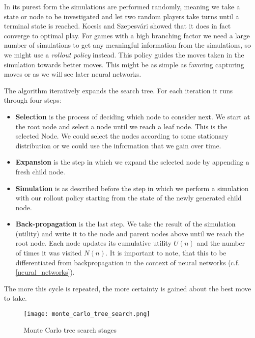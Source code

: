 In its purest form the simulations are performed randomly, meaning we take a state or node to be investigated and let two random players take turns until a terminal state is reached. Kocsis and Szepesvári \cite{kocsis_bandit_2006} showed that it does in fact converge to optimal play. For games with a high branching factor we need a large number of simulations to get any meaningful information from the simulations, so we might use a \textit{rollout policy} instead. This policy guides the moves taken in the simulation towards better moves. This might be as simple as favoring capturing moves or as we will see later neural networks.

The algorithm iteratively expands the search tree. For each iteration it runs through four steps:
\begin{itemize}
    \item \textbf{Selection} is the process of deciding which node to consider next. We start at the root node and select a node until we reach a leaf node. This is the selected Node. We could select the nodes according to some stationary distribution or we could use the information that we gain over time.

    \item \textbf{Expansion} is the step in which we expand the selected node by appending a fresh child node.

    \item \textbf{Simulation} is as described before the step in which we perform a simulation with our rollout policy starting from the state of the newly generated child node.

    \item \textbf{Back-propagation} is the last step. We take the result of the simulation (utility) and write it to the node and parent nodes above until we reach the root node. Each node updates its cumulative utility $U(n)$ and the number of times it was visited $N(n)$. It is important to note, that this to be differentiated from backpropagation in the context of neural networks (c.f. \ref{neural_networks}).
\end{itemize}

The more this cycle is repeated, the more certainty is gained about the best move to take.

\begin{figure}
    \centering
    \texttt{[image: monte\_carlo\_tree\_search.png]}
    \caption{Monte Carlo tree search stages \cite{noauthor_fig_nodate}}
    \label{monte_carlo_tree_search}
\end{figure}

